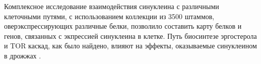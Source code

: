 Комплексное исследование взаимодействия синуклеина с различными клеточными путями, с использованием коллекции из 3500 штаммов, оверэкспрессирующих различные белки, позволило составить карту белков и генов, связанных с экпрессией синуклеина в клетке. Путь биосинтезе эргостерола и TOR каскад, как было найдено, влияют на эффекты, оказываемые синуклеином в дрожжах \cite{yeger-lotem_bridging_2009}.













































